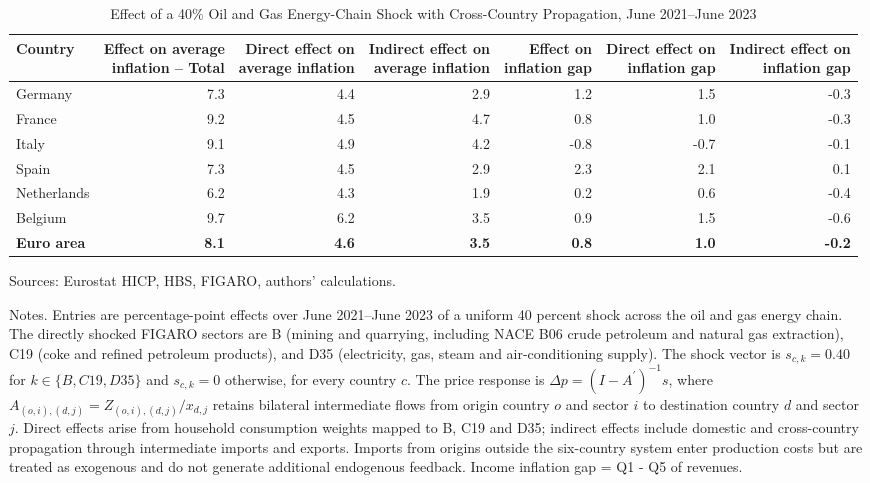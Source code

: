 \documentclass[11pt]{article}
\begin{document}
\begin{table}[H]
\centering
\caption{Effect of a 40\% Oil and Gas Energy-Chain Shock with Cross-Country Propagation, June 2021--June 2023}
\scriptsize
\setlength{\tabcolsep}{4.2pt}
\begin{tabular}{lrrrrrr}
\toprule
Country & \shortstack{Effect on average\\inflation -- Total} & \shortstack{Direct effect on\\average inflation} & \shortstack{Indirect effect on\\average inflation} & \shortstack{Effect on\\inflation gap} & \shortstack{Direct effect on\\inflation gap} & \shortstack{Indirect effect on\\inflation gap}
 \\
\midrule
Germany & 7.3 & 4.4 & 2.9 & 1.2 & 1.5 & -0.3
 \\
France & 9.2 & 4.5 & 4.7 & 0.8 & 1.0 & -0.3
 \\
Italy & 9.1 & 4.9 & 4.2 & -0.8 & -0.7 & -0.1
 \\
Spain & 7.3 & 4.5 & 2.9 & 2.3 & 2.1 & 0.1
 \\
Netherlands & 6.2 & 4.3 & 1.9 & 0.2 & 0.6 & -0.4
 \\
Belgium & 9.7 & 6.2 & 3.5 & 0.9 & 1.5 & -0.6
 \\
\midrule
\textbf{Euro area} & \textbf{8.1} & \textbf{4.6} & \textbf{3.5} & \textbf{0.8} & \textbf{1.0} & \textbf{-0.2}
 \\
\bottomrule
\end{tabular}
\par\vspace{0.35em}\footnotesize\noindent Sources: Eurostat HICP, HBS, FIGARO, authors' calculations.
\par\vspace{0.25em}\footnotesize\noindent Notes. Entries are percentage-point effects over June 2021--June 2023 of a uniform 40 percent shock across the oil and gas energy chain. The directly shocked FIGARO sectors are B (mining and quarrying, including NACE B06 crude petroleum and natural gas extraction), C19 (coke and refined petroleum products), and D35 (electricity, gas, steam and air-conditioning supply). The shock vector is $s_{c,k}=0.40$ for $k\in\{B,C19,D35\}$ and $s_{c,k}=0$ otherwise, for every country $c$. The price response is $\Delta p = (I - A^{\prime})^{-1}s$, where $A_{(o,i),(d,j)}=Z_{(o,i),(d,j)}/x_{d,j}$ retains bilateral intermediate flows from origin country $o$ and sector $i$ to destination country $d$ and sector $j$. Direct effects arise from household consumption weights mapped to B, C19 and D35; indirect effects include domestic and cross-country propagation through intermediate imports and exports. Imports from origins outside the six-country system enter production costs but are treated as exogenous and do not generate additional endogenous feedback. Income inflation gap = Q1 - Q5 of revenues.
\end{table}
\vspace{0.6em}
\end{document}
